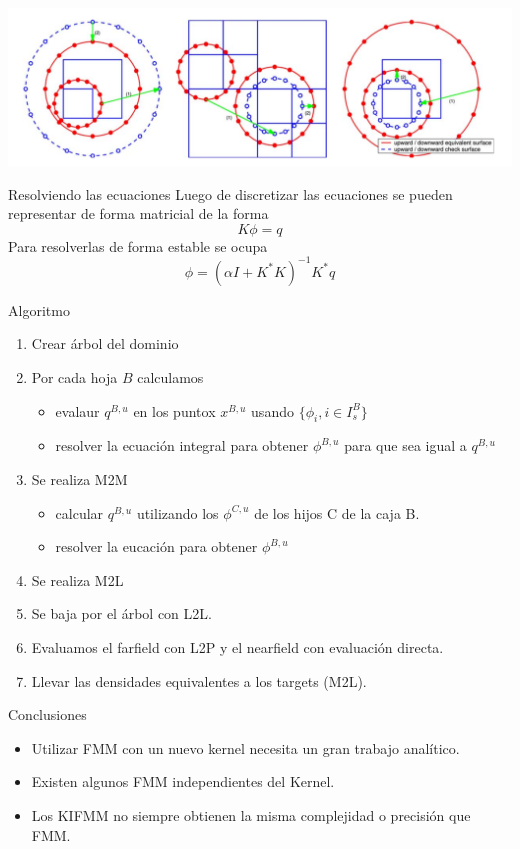 \documentclass{beamer}
\begin{document}
\begin{frame}
 \begin{center}
 \includegraphics[scale=0.27]{transformation.png}
 \end{center}
\end{frame}
\begin{frame}{Resolviendo las ecuaciones}
Luego de discretizar las ecuaciones se pueden representar de forma matricial de la forma
$$ K \phi = q$$
Para resolverlas de forma estable se ocupa
$$\phi = \left( \alpha I  + K^*K \right)^{-1}K^*q$$
\end{frame}

\begin{frame}{Algoritmo}
\begin{enumerate}
    \item Crear árbol del dominio
    \item Por cada hoja $B$ calculamos
    \begin{itemize}
        \item evalaur $q^{B,u}$ en los puntox $x^{B,u}$ usando $\{\phi_i, i \in I_s^B\}$
        \item resolver la ecuación integral para obtener $\phi^{B,u}$ para que sea igual a $q^{B,u}$
    \end{itemize}
    \item Se realiza M2M
    \begin{itemize}
        \item calcular $q^{B,u}$ utilizando los $\phi^{C,u}$ de los hijos C de la caja B.
        \item resolver la eucación para obtener $\phi^{B,u}$
    \end{itemize}
    \item Se realiza M2L
    \item Se baja por el árbol con L2L.
    \item Evaluamos el farfield con L2P y el nearfield con evaluación directa.

    \item Llevar las densidades equivalentes a los targets (M2L).
\end{enumerate}
\end{frame}

\begin{frame}{Conclusiones}
\begin{itemize}
    \item Utilizar FMM con un nuevo kernel necesita un gran trabajo analítico.
    \item Existen algunos FMM independientes del Kernel.
    \item Los KIFMM no siempre obtienen la misma complejidad o precisión que FMM.
\end{itemize}
\end{frame}
\end{document}
